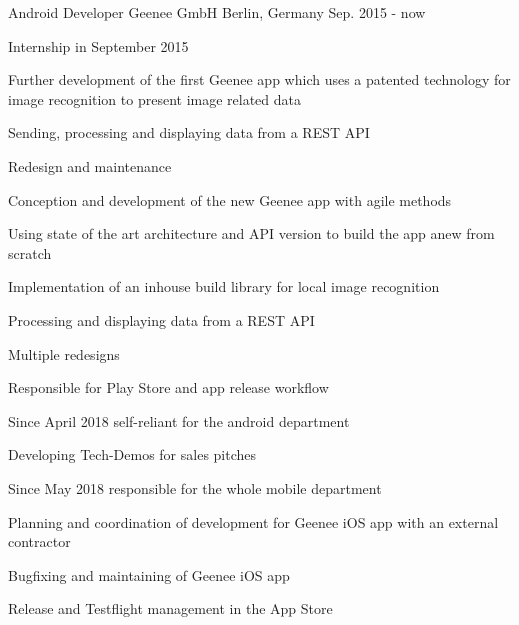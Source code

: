 

\begin{cventries}

  \cventry
    {Android Developer} %
    {Geenee GmbH} %
    {Berlin, Germany} %
    {Sep. 2015 - now} %
    {
      \begin{cvitems} %
        \item {Internship in September 2015}
        \item {Further development of the first Geenee app which uses a patented technology for image recognition to present image related data}
        \begin{cvsubitems}
          \item {Sending, processing and displaying data from a REST API}
          \item {Redesign and maintenance}
        \end{cvsubitems}
        \item {Conception and development of the new Geenee app with agile methods}
        \begin{cvsubitems}
          \item {Using state of the art architecture and API version to build the app anew from scratch}
          \item {Implementation of an inhouse build library for local image recognition}
          \item {Processing and displaying data from a REST API}
          \item {Multiple redesigns}
          \item {Responsible for Play Store and app release workflow}
          \item {Since April 2018 self-reliant for the android department}
        \end{cvsubitems}
        \item {Developing Tech-Demos for sales pitches}
        \item {Since May 2018 responsible for the whole mobile department}
        \begin{cvsubitems}
        \item {Planning and coordination of development for Geenee iOS app with an external contractor}
        \item {Bugfixing and maintaining of Geenee iOS app}
        \item {Release and Testflight management in the App Store}
        \end{cvsubitems}
      \end{cvitems}
    }


\end{cventries}
